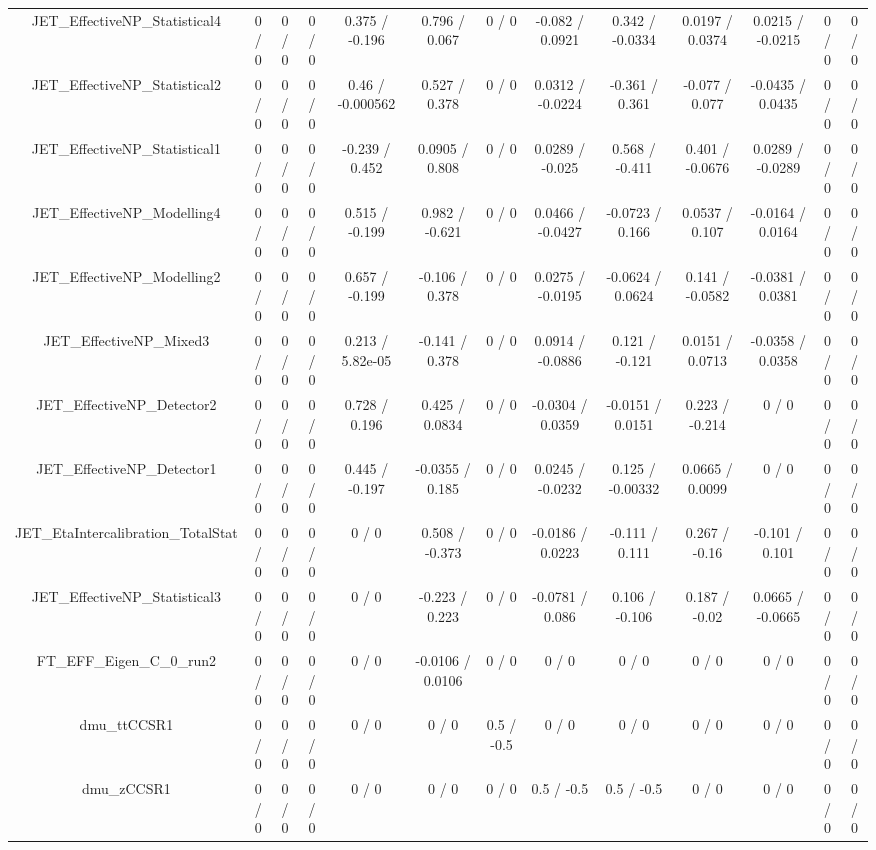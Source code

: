 \documentclass[10pt]{article}
\begin{document}
\begin{table}[htbp]
\begin{center}
\begin{tabular}{|c|c|c|c|c|c|c|c|c|c|c|c|c|}
  JET_EffectiveNP_Statistical4 & 0 / 0 & 0 / 0 & 0 / 0 & 0.375 / -0.196 & 0.796 / 0.067 & 0 / 0 & -0.082 / 0.0921 & 0.342 / -0.0334 & 0.0197 / 0.0374 & 0.0215 / -0.0215 & 0 / 0 & 0 / 0 \\ 
  JET_EffectiveNP_Statistical2 & 0 / 0 & 0 / 0 & 0 / 0 & 0.46 / -0.000562 & 0.527 / 0.378 & 0 / 0 & 0.0312 / -0.0224 & -0.361 / 0.361 & -0.077 / 0.077 & -0.0435 / 0.0435 & 0 / 0 & 0 / 0 \\ 
  JET_EffectiveNP_Statistical1 & 0 / 0 & 0 / 0 & 0 / 0 & -0.239 / 0.452 & 0.0905 / 0.808 & 0 / 0 & 0.0289 / -0.025 & 0.568 / -0.411 & 0.401 / -0.0676 & 0.0289 / -0.0289 & 0 / 0 & 0 / 0 \\ 
  JET_EffectiveNP_Modelling4 & 0 / 0 & 0 / 0 & 0 / 0 & 0.515 / -0.199 & 0.982 / -0.621 & 0 / 0 & 0.0466 / -0.0427 & -0.0723 / 0.166 & 0.0537 / 0.107 & -0.0164 / 0.0164 & 0 / 0 & 0 / 0 \\ 
  JET_EffectiveNP_Modelling2 & 0 / 0 & 0 / 0 & 0 / 0 & 0.657 / -0.199 & -0.106 / 0.378 & 0 / 0 & 0.0275 / -0.0195 & -0.0624 / 0.0624 & 0.141 / -0.0582 & -0.0381 / 0.0381 & 0 / 0 & 0 / 0 \\ 
  JET_EffectiveNP_Mixed3 & 0 / 0 & 0 / 0 & 0 / 0 & 0.213 / 5.82e-05 & -0.141 / 0.378 & 0 / 0 & 0.0914 / -0.0886 & 0.121 / -0.121 & 0.0151 / 0.0713 & -0.0358 / 0.0358 & 0 / 0 & 0 / 0 \\ 
  JET_EffectiveNP_Detector2 & 0 / 0 & 0 / 0 & 0 / 0 & 0.728 / 0.196 & 0.425 / 0.0834 & 0 / 0 & -0.0304 / 0.0359 & -0.0151 / 0.0151 & 0.223 / -0.214 & 0 / 0 & 0 / 0 & 0 / 0 \\ 
  JET_EffectiveNP_Detector1 & 0 / 0 & 0 / 0 & 0 / 0 & 0.445 / -0.197 & -0.0355 / 0.185 & 0 / 0 & 0.0245 / -0.0232 & 0.125 / -0.00332 & 0.0665 / 0.0099 & 0 / 0 & 0 / 0 & 0 / 0 \\ 
  JET_EtaIntercalibration_TotalStat & 0 / 0 & 0 / 0 & 0 / 0 & 0 / 0 & 0.508 / -0.373 & 0 / 0 & -0.0186 / 0.0223 & -0.111 / 0.111 & 0.267 / -0.16 & -0.101 / 0.101 & 0 / 0 & 0 / 0 \\ 
  JET_EffectiveNP_Statistical3 & 0 / 0 & 0 / 0 & 0 / 0 & 0 / 0 & -0.223 / 0.223 & 0 / 0 & -0.0781 / 0.086 & 0.106 / -0.106 & 0.187 / -0.02 & 0.0665 / -0.0665 & 0 / 0 & 0 / 0 \\ 
  FT_EFF_Eigen_C_0_run2 & 0 / 0 & 0 / 0 & 0 / 0 & 0 / 0 & -0.0106 / 0.0106 & 0 / 0 & 0 / 0 & 0 / 0 & 0 / 0 & 0 / 0 & 0 / 0 & 0 / 0 \\ 
  dmu_ttCCSR1 & 0 / 0 & 0 / 0 & 0 / 0 & 0 / 0 & 0 / 0 & 0.5 / -0.5 & 0 / 0 & 0 / 0 & 0 / 0 & 0 / 0 & 0 / 0 & 0 / 0 \\ 
  dmu_zCCSR1 & 0 / 0 & 0 / 0 & 0 / 0 & 0 / 0 & 0 / 0 & 0 / 0 & 0.5 / -0.5 & 0.5 / -0.5 & 0 / 0 & 0 / 0 & 0 / 0 & 0 / 0 \\ 

\end{tabular}
\end{center}
\end{table}
\end{document}

